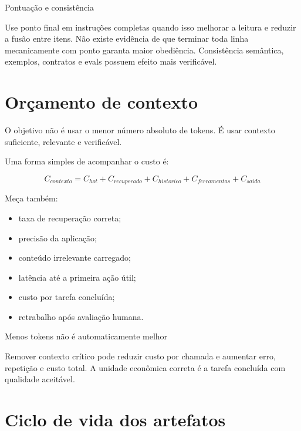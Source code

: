 \documentclass[
  10pt,
  a4paper,
  oneside]{book}
\providecommand{\tightlist}{%
  \setlength{\itemsep}{0pt}\setlength{\parskip}{0pt}}
\begin{document}
\begin{infobox}{Pontuação e consistência}

Use ponto final em instruções completas quando isso melhorar a leitura e
reduzir a fusão entre itens. Não existe evidência de que terminar toda
linha mecanicamente com ponto garanta maior obediência. Consistência
semântica, exemplos, contratos e evals possuem efeito mais verificável.

\end{infobox}

\hypertarget{oruxe7amento-de-contexto}{%
\section{Orçamento de contexto}\label{oruxe7amento-de-contexto}}

O objetivo não é usar o menor número absoluto de tokens. É usar contexto
suficiente, relevante e verificável.

Uma forma simples de acompanhar o custo é:

\[
C_{contexto} = C_{hot} + C_{recuperado} + C_{historico} + C_{ferramentas} + C_{saida}
\]

Meça também:

\begin{itemize}
\tightlist
\item
  taxa de recuperação correta;
\item
  precisão da aplicação;
\item
  conteúdo irrelevante carregado;
\item
  latência até a primeira ação útil;
\item
  custo por tarefa concluída;
\item
  retrabalho após avaliação humana.
\end{itemize}

\begin{warningbox}{Menos tokens não é automaticamente melhor}

Remover contexto crítico pode reduzir custo por chamada e aumentar erro,
repetição e custo total. A unidade econômica correta é a tarefa
concluída com qualidade aceitável.

\end{warningbox}

\hypertarget{ciclo-de-vida-dos-artefatos}{%
\section{Ciclo de vida dos
artefatos}\label{ciclo-de-vida-dos-artefatos}}
\end{document}
